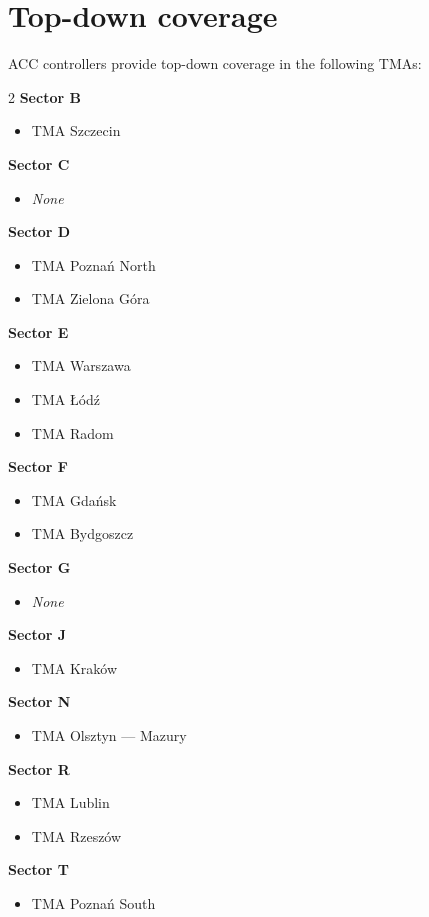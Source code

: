 \section{Top-down coverage}
\label{sec:acc:topdown}

ACC controllers provide top-down coverage in the following TMAs:
\begin{multicols}{2}
	\textbf{Sector B}
	\begin{itemize}
		\item TMA Szczecin
	\end{itemize}

	\textbf{Sector C}
	\begin{itemize}[label={}]
		\item \textit{None}
	\end{itemize}

	\textbf{Sector D}
	\begin{itemize}
		\item TMA Poznań North
		\item TMA Zielona Góra
	\end{itemize}

	\textbf{Sector E}
	\begin{itemize}
		\item TMA Warszawa
		\item TMA Łódź
		\item TMA Radom
	\end{itemize}

	\vfill\null\columnbreak

	\textbf{Sector F}
	\begin{itemize}
		\item TMA Gdańsk
		\item TMA Bydgoszcz
	\end{itemize}

	\textbf{Sector G}
	\begin{itemize}[label={}]
		\item \textit{None}
	\end{itemize}

	\textbf{Sector J}
	\begin{itemize}
		\item TMA Kraków
	\end{itemize}

	\textbf{Sector N}
	\begin{itemize}
		\item TMA Olsztyn --- Mazury
	\end{itemize}

	\textbf{Sector R}
	\begin{itemize}
		\item TMA Lublin
		\item TMA Rzeszów
	\end{itemize}

	\textbf{Sector T}
	\begin{itemize}
		\item TMA Poznań South
	\end{itemize}
\end{multicols}

